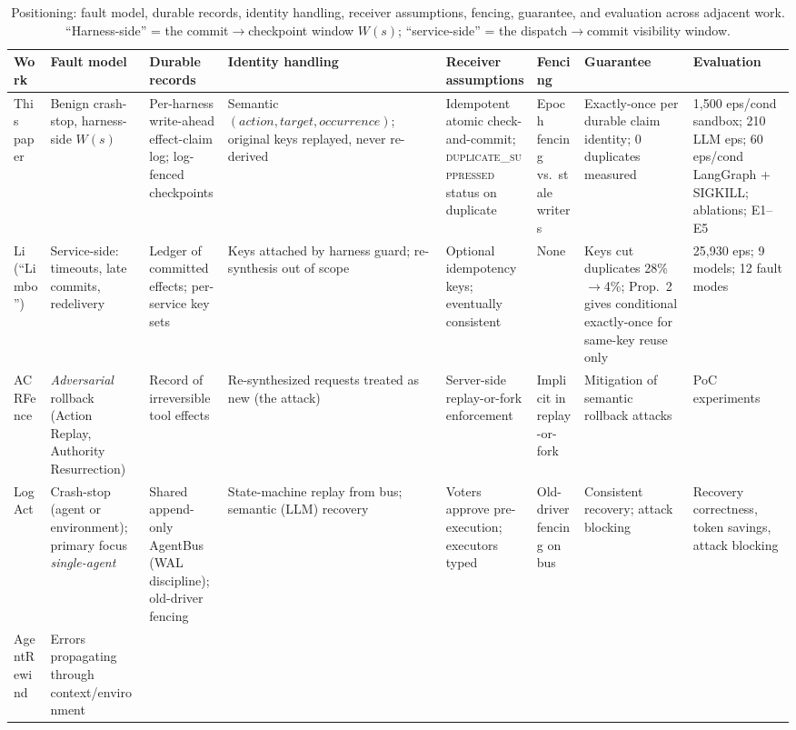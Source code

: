 \documentclass[10pt,journal,compsoc]{IEEEtran}
\begin{document}
\begin{table}[t]
\centering
\scriptsize
\caption{Positioning: fault model, durable records, identity handling,
receiver assumptions, fencing, guarantee, and evaluation across adjacent work.
``Harness-side'' = the commit$\to$checkpoint window $W(s)$; ``service-side'' =
the dispatch$\to$commit visibility window.}
\label{tab:positioning}
\begin{tabular}{p{1.7cm}p{1.8cm}p{1.9cm}p{1.9cm}p{1.9cm}p{1.5cm}p{1.8cm}p{1.9cm}}
\toprule
Work & Fault model & Durable records & Identity handling & Receiver assumptions & Fencing & Guarantee & Evaluation \\
\midrule
This paper &
Benign crash-stop, harness-side $W(s)$ &
Per-harness write-ahead effect-claim log; log-fenced checkpoints &
Semantic $(\mathit{action},\allowbreak\mathit{target},\allowbreak\mathit{occurrence})$;
original keys replayed, never re-derived &
Idempotent atomic check-and-commit; \textsc{duplicate\_suppressed} status on duplicate &
Epoch fencing vs.\ stale writers &
Exactly-once per durable claim identity; 0 duplicates measured &
1,500 eps/cond sandbox; 210 LLM eps; 60 eps/cond LangGraph + SIGKILL; ablations; E1--E5 \\
\midrule
Li~\cite{limbo2026} (``Limbo'') &
Service-side: timeouts, late commits, redelivery &
Ledger of committed effects; per-service key sets &
Keys attached by harness guard; re-synthesis out of scope &
Optional idempotency keys; eventually consistent &
None &
Keys cut duplicates 28\%$\to$4\%; Prop.~2 gives conditional exactly-once for same-key reuse only &
25,930 eps; 9 models; 12 fault modes \\
\midrule
ACRFence~\cite{acrfence2026} &
\emph{Adversarial} rollback (Action Replay, Authority Resurrection) &
Record of irreversible tool effects &
Re-synthesized requests treated as new (the attack) &
Server-side replay-or-fork enforcement &
Implicit in replay-or-fork &
Mitigation of semantic rollback attacks &
PoC experiments \\
\midrule
LogAct~\cite{logact2026} &
Crash-stop (agent or environment); primary focus \emph{single-agent} &
Shared append-only AgentBus (WAL discipline); old-driver fencing &
State-machine replay from bus; semantic (LLM) recovery &
Voters approve pre-execution; executors typed &
Old-driver fencing on bus &
Consistent recovery; attack blocking &
Recovery correctness, token savings, attack blocking \\
\midrule
AgentRewind~\cite{agentrewind2026} &
Errors propagating through context/environment &

\end{tabular}
\end{table}
\end{document}

